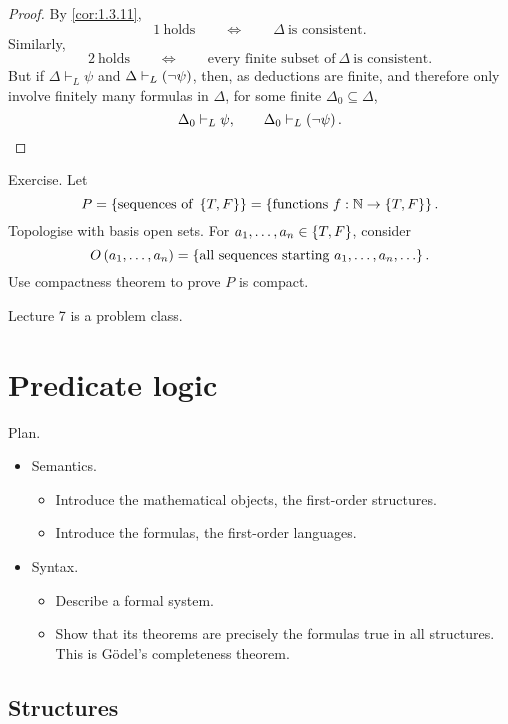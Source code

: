 \begin{proof}
By \ref{cor:1.3.11},
$$ 1 \ \text{holds} \qquad \iff \qquad \Delta \ \text{is consistent}. $$
Similarly,
$$ 2 \ \text{holds} \qquad \iff \qquad \text{every finite subset of} \ \Delta \ \text{is consistent}. $$
But if $ \Delta \vdash_L \psi $ and $ \Delta \vdash_L \left( \neg \psi \right) $, then, as deductions are finite, and therefore only involve finitely many formulas in $ \Delta $, for some finite $ \Delta_0 \subseteq \Delta $,
$$ \Delta_0 \vdash_L \psi, \qquad \Delta_0 \vdash_L \left( \neg \psi \right). $$
\end{proof}

\begin{example*}
Exercise. Let
$$ P = \left\{ \text{sequences of} \ \left\{ T, F \right\} \right\} = \left\{ \text{functions} \ f : \mathbb{N} \to \left\{ T, F \right\} \right\}. $$
Topologise with basis open sets. For $ a_1, \dots, a_n \in \left\{ T, F \right\} $, consider
$$ O\rb{a_1, \dots, a_n} = \cb{\text{all sequences starting} \ a_1, \dots, a_n, \dots}. $$
Use compactness theorem to prove $ P $ is compact.
\end{example*}


Lecture 7 is a problem class.

\pagebreak

\section{Predicate logic}


Plan.
\begin{itemize}
\item Semantics.
\begin{itemize}
\item Introduce the mathematical objects, the first-order structures.
\item Introduce the formulas, the first-order languages.
\end{itemize}
\item Syntax.
\begin{itemize}
\item Describe a formal system.
\item Show that its theorems are precisely the formulas true in all structures. This is G\"odel's completeness theorem.
\end{itemize}
\end{itemize}

\subsection{Structures}

